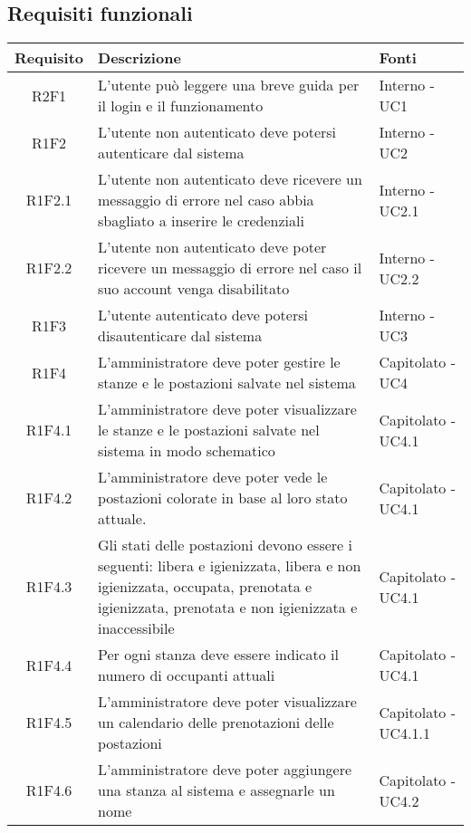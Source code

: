\subsection{Requisiti funzionali}
\begin{center}
	\begin{longtable}{|c|p{10cm}|p{4cm}|}
		\hline
		\rowcolor{lighter-grayer}
		\textbf{Requisito} & \textbf{Descrizione} & \textbf{Fonti}  \\
		\hline
		\endfirsthead
		
		 R2F1 & L'utente può leggere una breve guida per il login e il funzionamento & Interno - UC1 \\
		\hline
		R1F2	&	L'utente non autenticato deve potersi autenticare dal sistema& Interno - UC2	\\
		\hline
		R1F2.1	&	L'utente non autenticato deve ricevere un messaggio di errore nel caso abbia sbagliato a inserire le credenziali& Interno - UC2.1	\\
		\hline
		R1F2.2	&	L'utente non autenticato deve poter ricevere un messaggio di errore nel caso il suo account venga disabilitato& Interno - UC2.2	\\
		\hline
		R1F3	&	L'utente autenticato deve potersi disautenticare dal sistema& Interno - UC3	\\
		\hline
			R1F4&L'amministratore deve poter gestire le stanze e le postazioni salvate nel sistema	& Capitolato - UC4	\\
					\hline
			R1F4.1&L'amministratore deve poter visualizzare le stanze e le postazioni salvate nel sistema in modo schematico	& Capitolato - UC4.1	\\
					\hline
			R1F4.2&	L'amministratore deve poter vede le postazioni colorate in base al loro stato attuale.& Capitolato - UC4.1	\\
					\hline
			R1F4.3&	Gli stati delle postazioni devono essere i seguenti: libera e igienizzata, libera e non igienizzata, occupata, prenotata e igienizzata, prenotata e non igienizzata e inaccessibile& 	Capitolato - UC4.1\\
					\hline
			R1F4.4&Per ogni stanza deve essere indicato il numero di occupanti attuali	& Capitolato - UC4.1	\\
					\hline
			R1F4.5&L'amministratore deve poter visualizzare un calendario delle prenotazioni delle postazioni	& Capitolato - UC4.1.1	\\
					\hline
				R1F4.6&L'amministratore deve poter aggiungere una stanza al sistema e assegnarle un nome	& Capitolato - UC4.2	\\

\end{longtable}
\end{center}
